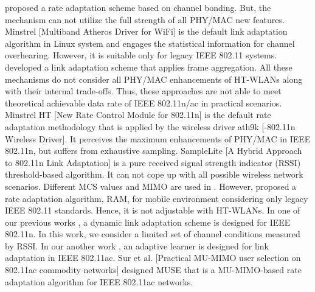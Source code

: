  \cite{deek_joint_2013}   \citet{deek_joint_2013} proposed a rate adaptation scheme based on channel bonding. But, the mechanism can not utilize the full strength of all PHY/MAC new features. Minstrel [Multiband Atheros Driver for WiFi] is the default link adaptation algorithm in Linux system and engages the statistical information for channel overhearing. However, it is suitable only for legacy IEEE 802.11 systems.   \newline 
 \cite{feng_frame-aggregated_2010}   \citet{feng_frame-aggregated_2010} developed a link adaptation scheme that applies frame aggregation. All these mechanisms do not consider all PHY/MAC enhancements of HT-WLANs along with their internal trade-offs. Thus, these approaches are not able to meet theoretical achievable data rate of IEEE 802.11n/ac in practical scenarios. Minstrel HT [New Rate Control Module for 802.11n] is the default rate adaptation methodology that is applied by the wireless driver ath9k [-802.11n Wireless Driver]. It perceives the maximum enhancements of PHY/MAC in IEEE 802.11n, but suffers from exhaustive sampling. SampleLite [A Hybrid Approach to 802.11n Link Adaptation] is a pure received signal strength indicator (RSSI) threshold-based algorithm. It can not cope up with all possible wireless network scenarios.   \newline 
 \cite{qiuyan_xia_open-loop_2009}   Different MCS values and MIMO are used in \cite{das_link_2008} \cite{qiuyan_xia_open-loop_2009}.   \newline 
 \cite{chen_ram_2012}   However, \citet{chen_ram_2012} proposed a rate adaptation algorithm, RAM, for mobile environment considering only legacy IEEE 802.11 standards. Hence, it is not adjustable with HT-WLANs.   \newline 
 \cite{karmakar_dynamic_2015}   In one of our previous works \cite{karmakar_dynamic_2015}, a dynamic link adaptation scheme is designed for IEEE 802.11n. In this work, we consider a limited set of channel conditions measured by RSSI.   \newline 
 \cite{karmakar_dynamic_2016}   In our another work \cite{karmakar_dynamic_2016}, an adaptive learner is designed for link adaptation in IEEE 802.11ac. Sur et al. [Practical MU-MIMO user selection on 802.11ac commodity networks] designed MUSE that is a MU-MIMO-based rate adaptation algorithm for IEEE 802.11ac networks.   \newline 
 \cite{al-turjman_mobile_2017}    \newline 
 \cite{chevillat_dynamic_2005}    \newline 
